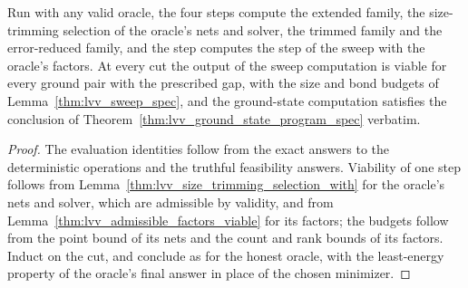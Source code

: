\begin{theorem}
    \label{thm:lvv_valid_oracle_correct}
    \leanok
    Run with any valid oracle, the four steps compute the extended family, the
    size-trimming selection of the oracle's nets and solver, the trimmed family
    and the error-reduced family, and the step computes the step of the sweep
    with the oracle's factors. At every cut the output of the sweep computation
    is viable for every ground pair with the prescribed gap, with the size and
    bond budgets of Lemma~\ref{thm:lvv_sweep_spec}, and the ground-state
    computation satisfies the conclusion of
    Theorem~\ref{thm:lvv_ground_state_program_spec} verbatim.
\end{theorem}
\begin{proof}
    \leanok
    The evaluation identities follow from the exact answers to the
    deterministic operations and the truthful feasibility answers. Viability of
    one step follows from Lemma~\ref{thm:lvv_size_trimming_selection_with} for
    the oracle's nets and solver, which are admissible by validity, and from
    Lemma~\ref{thm:lvv_admissible_factors_viable} for its factors; the budgets
    follow from the point bound of its nets and the count and rank bounds of
    its factors. Induct on the cut, and conclude as for the honest oracle, with
    the least-energy property of the oracle's final answer in place of the
    chosen minimizer.
\end{proof}

